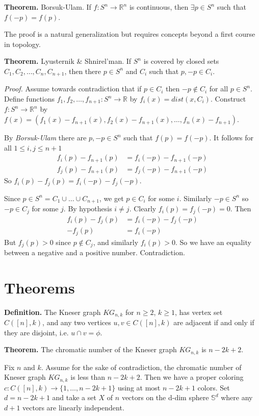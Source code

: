 \documentclass[12pt]{extarticle}
\begin{document}
\textbf{Theorem.} Borsuk-Ulam. If $f: S^n \rightarrow \mathbb{R}^n$ is continuous, then $\exists p \in S^n$ such that $f(-p) = f(p)$.

The proof is a natural generalization but requires concepts beyond a first course in topology.

\textbf{Theorem.} Lyusternik \& Shnirel'man. If $S^n$ is covered by closed sets $C_1, C_2, \dots, C_n, C_{n+1}$, then there $p \in S^n$ and $C_i$ such that $p,-p \in C_i$.

\textit{Proof.} Assume towards contradiction that if $p \in C_i$ then $-p \not\in C_i$ for all $p \in S^n$. Define functions $f_1, f_2, \dots, f_{n+1}: S^n \rightarrow \mathbb{R}$ by $f_i(x) = dist(x, C_i)$. Construct $f: S^n \rightarrow \mathbb{R}^n$ by $f(x) = (f_1(x) - f_{n+1}(x), f_2(x) - f_{n+1}(x), \dots, f_n(x) - f_{n+1})$.

By \textit{Borsuk-Ulam} there are $p, -p \in S^n$ such that $f(p) = f(-p)$. It follows for all $1 \leq i,j \leq n+1$
\begin{align*}
    f_i(p) - f_{n+1}(p) &= f_i(-p) - f_{n+1}(-p)\\
    f_j(p) - f_{n+1}(p) &= f_j(-p) - f_{n+1}(-p)
\end{align*}
So $f_i(p) - f_j(p) = f_i(-p) - f_j(-p)$.

Since $p \in S^n = C_1 \cup \dots \cup C_{n+1}$, we get $p \in C_i$ for some $i$. Similarly $-p \in S^n$ so $-p \in C_j$ for some $j$. By hypothesis $i \neq j$. Clearly $f_i(p) = f_j(-p) = 0$. Then
\begin{align*}
    f_i(p) - f_j(p) &= f_i(-p) - f_j(-p) \\
    -f_j(p) &= f_i(-p)
\end{align*}
But $f_j(p) > 0$ since $p \not\in C_j$, and similarly $f_i(p) > 0$. So we have an equality between a negative and a positive number. Contradiction.


\section{Theorems}

\textbf{Definition.} The Kneser graph $KG_{n,k}$ for $n \geq 2$, $k \geq 1$, has vertex set $C([n], k)$, and any two vertices $u,v \in C([n], k)$ are adjacent if and only if they are disjoint, i.e. $u \cap v = \phi$.

\textbf{Theorem.} The chromatic number of the Kneser graph $KG_{n,k}$ is $n-2k+2$.

Fix $n$ and $k$. Assume for the sake of contradiction, the chromatic number of Kneser graph $KG_{n,k}$ is less than $n-2k+2$. Then we have a proper coloring $c: C([n], k) \rightarrow \{ 1, \dots, n-2k+1 \}$ using at most $n-2k+1$ colors. Set $d = n-2k+1$ and take a set $X$ of $n$ vectors on the d-dim sphere $\mathbb{S}^d$ where any $d+1$ vectors are linearly independent.
\end{document}

